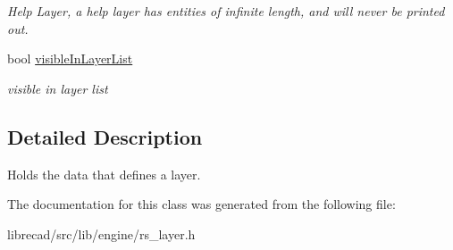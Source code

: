 \begin{DoxyCompactItemize}
\begin{DoxyCompactList}\small\item\em Help Layer, a help layer has entities of infinite length, and will never be printed out. \end{DoxyCompactList}\item 
\hypertarget{classRS__LayerData_aa96d42937afc82cd29b42908ce5acc4a}{bool \hyperlink{classRS__LayerData_aa96d42937afc82cd29b42908ce5acc4a}{visible\-In\-Layer\-List}}\label{classRS__LayerData_aa96d42937afc82cd29b42908ce5acc4a}

\begin{DoxyCompactList}\small\item\em visible in layer list \end{DoxyCompactList}\end{DoxyCompactItemize}


\subsection{Detailed Description}
Holds the data that defines a layer. 

The documentation for this class was generated from the following file\-:\begin{DoxyCompactItemize}
\item 
librecad/src/lib/engine/rs\-\_\-layer.\-h\end{DoxyCompactItemize}
